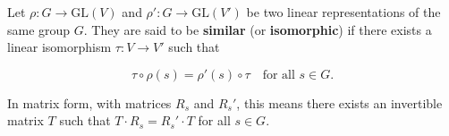 Let $\rho: G \to \text{GL}(V)$ and $\rho': G \to \text{GL}(V')$ be two linear representations of the same group $G$. They are said to be \textbf{similar} (or \textbf{isomorphic}) if there exists a linear isomorphism $\tau: V \to V'$ such that

$$\tau \circ \rho(s) = \rho'(s) \circ \tau \quad \text{for all } s \in G.$$

In matrix form, with matrices $R_s$ and $R_s'$, this means there exists an invertible matrix $T$ such that $T \cdot R_s = R_s' \cdot T$ for all $s \in G$.
